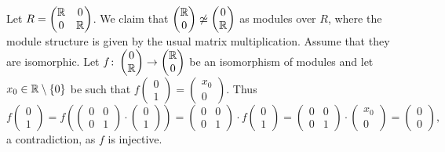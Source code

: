 \begin{example}
	Let $R=
		\begin{pmatrix}
			\mathbb{R} & 0\\
			0 & \mathbb{R}
		\end{pmatrix}$. 
	We claim that 
	$\begin{pmatrix}
			\mathbb{R}\\
			0
		\end{pmatrix}
		\not\simeq\begin{pmatrix}
			0\\
			\mathbb{R}
		\end{pmatrix}$
	as modules over $R$, where the module structure is given by the usual matrix multiplication. 
	Assume that they are isomorphic. 
	Let $f\colon\begin{pmatrix}
			0\\
			\mathbb{R}
		\end{pmatrix}
		\to\begin{pmatrix}
			\mathbb{R}\\
			0
		\end{pmatrix}$  
	be an isomorphism of modules and let  
	$x_0\in\mathbb{R}\setminus\{0\}$ be such that 
	$f\begin{pmatrix}0\\1\end{pmatrix}=\begin{pmatrix}x_0\\0\end{pmatrix}$. Thus 
	\[
	f\begin{pmatrix}
	0\\
	1\end{pmatrix}
	=f\left(\begin{pmatrix}
	0&0\\
	0&1\end{pmatrix}
	\cdot 
	\begin{pmatrix}
	0\\
	1
	\end{pmatrix}\right)
	=\begin{pmatrix}
	0&0\\
	0&1\end{pmatrix}\cdot f\begin{pmatrix}0\\1\end{pmatrix}
	=\begin{pmatrix}
	0&0\\
	0&1
	\end{pmatrix}
	\cdot 
	\begin{pmatrix}		
	x_0\\
	0
	\end{pmatrix}
	=\begin{pmatrix}
	0\\
	0
	\end{pmatrix},
	\]	
	a contradiction, as $f$ is injective.    
\end{example}

